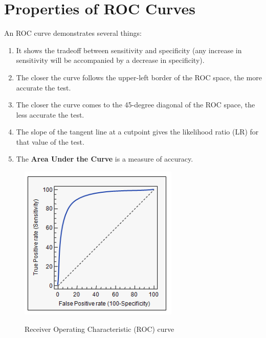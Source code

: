 \documentclass[]{report}
\begin{document}
\section*{Properties of ROC Curves}
An ROC curve demonstrates several things:
\begin{enumerate}
	\item It shows the tradeoff between sensitivity and specificity (any increase in sensitivity will be accompanied by a decrease in specificity).
	\item The closer the curve follows the upper-left border of the ROC space, the more accurate the test.
	\item The closer the curve comes to the 45-degree diagonal of the ROC space, the less accurate the test.
	\item The slope of the tangent line at a cutpoint gives the likelihood ratio (LR) for that value of the test.
	\item The \textbf{Area Under the Curve} is a measure of accuracy.
\end{enumerate}





\begin{figure}[h!]
	\centering
	\includegraphics[scale=0.8]{images/ROCcurve.PNG}\\
	\caption{Receiver Operating Characteristic (ROC) curve }\label{ROC1}
\end{figure}
\end{document}
